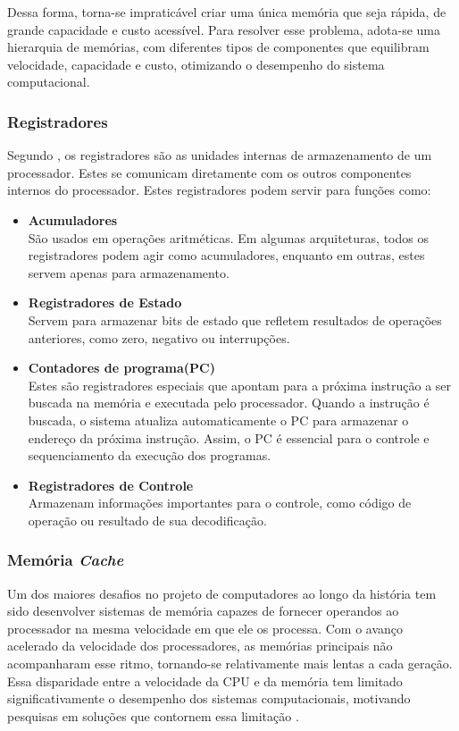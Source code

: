 \documentclass[
	12pt,				%
	openright,			%
	oneside,			%
	a4paper,			%
	english,			%
	french,				%
	spanish,			%
	brazil,				%
	]{abntex2}
\begin{document}
Dessa forma, torna-se impraticável criar uma única memória que seja rápida, de grande capacidade e custo acessível. Para resolver esse problema, adota-se uma hierarquia de memórias, com diferentes tipos de componentes que equilibram velocidade, capacidade e custo, otimizando o desempenho do sistema computacional.
\subsubsection{Registradores}
Segundo , os registradores são as unidades internas de armazenamento de um processador. Estes se comunicam diretamente com os outros componentes internos do processador. Estes registradores podem servir para funções como:
\begin{itemize}
    \item \textbf{Acumuladores}\\
    São usados em operações aritméticas. Em algumas arquiteturas, todos os registradores podem agir como acumuladores, enquanto em outras, estes servem apenas para armazenamento.
    \item \textbf{Registradores de Estado}\\
    Servem para armazenar bits de estado que refletem resultados de operações anteriores, como zero, negativo ou interrupções.
    \item \textbf{Contadores de programa(PC)}\\
     Estes são registradores especiais que apontam para a próxima instrução a ser buscada na memória e executada pelo processador. Quando a instrução é buscada, o sistema atualiza automaticamente o PC para armazenar o endereço da próxima instrução. Assim, o PC é essencial para o controle e sequenciamento da execução dos programas.\cite{favero_organizacao_2011}
     \item \textbf{Registradores de Controle}\\
     Armazenam informações importantes para o controle, como código de operação ou resultado de sua decodificação.
\end{itemize}

\subsubsection{Memória \textit{Cache}}

Um dos maiores desafios no projeto de computadores ao longo da história tem sido desenvolver sistemas de memória capazes de fornecer operandos ao processador na mesma velocidade em que ele os processa. Com o avanço acelerado da velocidade dos processadores, as memórias principais não acompanharam esse ritmo, tornando-se relativamente mais lentas a cada geração. Essa disparidade entre a velocidade da CPU e da memória tem limitado significativamente o desempenho dos sistemas computacionais, motivando pesquisas em soluções que contornem essa limitação \cite[p.304]{tanenbaum_structured_2013}.
\end{document}

